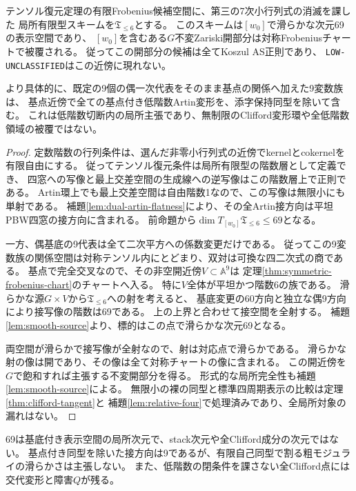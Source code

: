 \begin{theorem}[Clifford点の低階数近傍は対称チャートで被覆される]\label{thm:clifford-low-rank-local}
テンソル復元定理の有限Frobenius候補空間に、第三の7次小行列式の消滅を課した
局所有限型スキームを$\mathfrak T_{\leq6}$とする。
このスキームは$[w_0]$で滑らかな次元69の表示空間であり、
$[w_0]$を含むある$G$不変Zariski開部分は対称Frobeniusチャートで被覆される。
従ってこの開部分の候補は全てKoszul AS正則であり、
\texttt{LOW-UNCLASSIFIED}はこの近傍に現れない。

より具体的に、既定の9個の偶一次代表をそのまま基点の関係へ加えた9変数族は、
基点近傍で全ての基点付き低階数Artin変形を、添字保持同型を除いて含む。
これは低階数切断内の局所主張であり、無制限のClifford変形環や全低階数領域の被覆ではない。
\end{theorem}
\begin{proof}
定数階数の行列条件は、選んだ非零小行列式の近傍でkernelとcokernelを有限自由にする。
従ってテンソル復元条件は局所有限型の階数層として定義でき、
四窓への写像と最上交差空間の生成線への逆写像はこの階数層上で正則である。
Artin環上でも最上交差空間は自由階数1なので、この写像は無限小にも単射である。
補題\ref{lem:dual-artin-flatness}により、その全Artin接方向は平坦PBW四窓の接方向に含まれる。
前命題から$\dim T_{[w_0]}\mathfrak T_{\leq6}\leq69$となる。

一方、偶基底の9代表は全て二次平方への係数変更だけである。
従ってこの9変数族の関係空間は対称テンソル内にとどまり、双対は可換な四二次式の商である。
基点で完全交叉なので、その非空開近傍$V\subset\mathbb A^9$は
定理\ref{thm:symmetric-frobenius-chart}のチャートへ入る。
特に$V$全体が平坦かつ階数6の族である。
滑らかな源$G\times V$から$\mathfrak T_{\leq6}$への射を考えると、
基底変更の60方向と独立な偶9方向により接写像の階数は69である。
上の上界と合わせて接空間を全射する。
補題\ref{lem:smooth-source}より、標的はこの点で滑らかな次元69となる。

両空間が滑らかで接写像が全射なので、射は対応点で滑らかである。
滑らかな射の像は開であり、その像は全て対称チャートの像に含まれる。
この開近傍を$G$で飽和すれば主張する不変開部分を得る。
形式的な局所完全性も補題\ref{lem:smooth-source}による。
無限小の裸の同型と標準四周期表示の比較は定理\ref{thm:clifford-tangent}と
補題\ref{lem:relative-four}で処理済みであり、全局所対象の漏れはない。
\end{proof}
\begin{remark}
69は基底付き表示空間の局所次元で、stack次元や全Clifford成分の次元ではない。
基点付き同型を除いた接方向は9であるが、有限自己同型で割る粗モジュライの滑らかさは主張しない。
また、低階数の閉条件を課さない全Clifford点には交代変形と障害$Q$が残る。
\end{remark}

